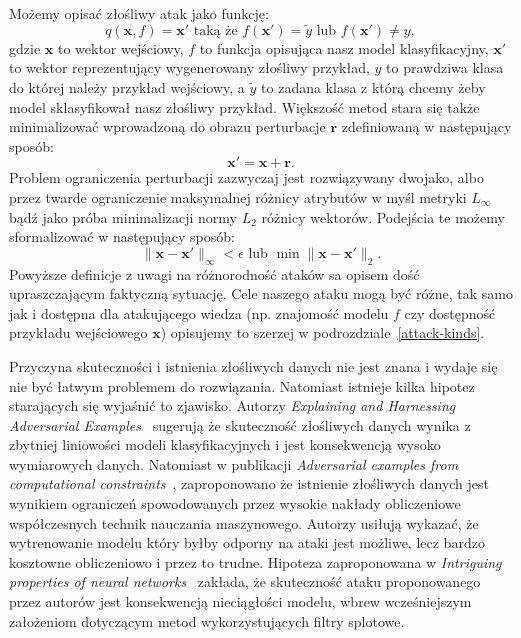 \documentclass[
    left=2.5cm,         %
    right=2.5cm,        %
    top=2.5cm,          %
    bottom=3cm,         %
    bindingoffset=6mm,  %
    nohyphenation=false %
]{eiti/eiti-thesis}
\renewcommand{\vec}[1]{\mathbf{#1}}
\begin{document}
Możemy opisać złośliwy atak jako funkcję:
\begin{equation}
    q(\vec{x}, f)=\vec{x'} \text{ taką że } f(\vec{x'})=\widetilde{y} \text{ lub } f(\vec{x'})\neq{y},
\end{equation}
gdzie $\vec{x}$ to wektor wejściowy, $f$ to funkcja opisująca nasz model klasyfikacyjny, $\vec{x'}$ to wektor reprezentujący wygenerowany złośliwy przykład,
$y$ to prawdziwa klasa do której należy przykład wejściowy, a $\widetilde{y}$ to zadana klasa z którą chcemy żeby model sklasyfikował nasz złośliwy przykład.
Większość metod stara się także minimalizować wprowadzoną do obrazu perturbacje $\vec{r}$ zdefiniowaną w następujący sposób:
\begin{equation}
    \vec{x'} = \vec{x} + \vec{r}.
\end{equation}
Problem ograniczenia perturbacji zazwyczaj jest rozwiązywany dwojako, albo przez twarde ograniczenie maksymalnej różnicy atrybutów w myśl metryki $L_\infty$ bądź
jako próba minimalizacji normy $L_2$ różnicy wektorów. Podejścia te możemy sformalizować w następujący sposób:
\begin{equation}
    \|\vec{x}-\vec{x'}\|_\infty < \epsilon \text{  lub  } \min \|\vec{x}-\vec{x'}\|_2.
\end{equation}
Powyższe definicje z uwagi na różnorodność ataków sa opisem dość upraszczającym faktyczną sytuację.
Cele naszego ataku mogą być różne, tak samo jak i dostępna dla atakującego wiedza (np. znajomość modelu $f$ czy dostępność przykładu wejściowego $\vec{x}$) opisujemy to szerzej w podrozdziale~\ref{attack-kinds}.

Przyczyna skuteczności i istnienia złośliwych danych nie jest znana i wydaje się nie być łatwym problemem do rozwiązania.
Natomiast istnieje kilka hipotez starających się wyjaśnić to zjawisko.
Autorzy \textit{Explaining and Harnessing Adversarial Examples}~\cite{harnessing} sugerują że skuteczność złośliwych danych wynika z zbytniej liniowości modeli klasyfikacyjnych
i jest konsekwencją wysoko wymiarowych danych.
Natomiast w publikacji \textit{Adversarial examples from computational constraints}~\cite{Bubeck2019AdversarialEF},
zaproponowano że istnienie złośliwych danych jest wynikiem ograniczeń spowodowanych przez wysokie nakłady obliczeniowe współczesnych technik nauczania maszynowego.
Autorzy usiłują wykazać, że wytrenowanie modelu który byłby odporny na ataki jest możliwe, lecz bardzo kosztowne obliczeniowo i przez to trudne.
Hipoteza zaproponowana w \textit{Intriguing properties of neural networks}~\cite{DBLP:journals/corr/SzegedyZSBEGF13} zakłada,
że skuteczność ataku proponowanego przez autorów jest konsekwencją nieciągłości modelu, wbrew wcześniejszym założeniom dotyczącym metod wykorzystujących filtry splotowe.
\end{document}
